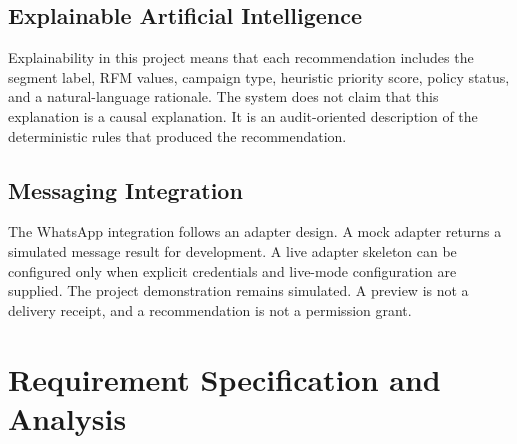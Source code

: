 \documentclass[12pt,a4paper]{report}
\begin{document}
\section{Explainable Artificial Intelligence}
Explainability in this project means that each recommendation includes the segment label, RFM values, campaign type, heuristic priority score, policy status, and a natural-language rationale. The system does not claim that this explanation is a causal explanation. It is an audit-oriented description of the deterministic rules that produced the recommendation.

\section{Messaging Integration}
The WhatsApp integration follows an adapter design. A mock adapter returns a simulated message result for development. A live adapter skeleton can be configured only when explicit credentials and live-mode configuration are supplied. The project demonstration remains simulated. A preview is not a delivery receipt, and a recommendation is not a permission grant.

\chapter{Requirement Specification and Analysis}
\end{document}
